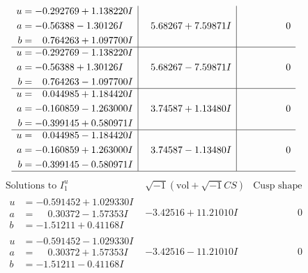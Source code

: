 \documentclass[1p]{elsarticle_modified}
\theoremstyle{definition}
\newcommand{\I}{\sqrt{-1}}
\begin{document}
$$\begin{array}{c|c|c}
\begin{aligned}
u &= -0.292769 + 1.138220 I \\
a &= -0.56388 - 1.30126 I \\
b &= \phantom{-}0.764263 + 1.097700 I\end{aligned}
 & \phantom{-}5.68267 + 7.59871 I & \phantom{-0.000000 } 0 \\ \hline\begin{aligned}
u &= -0.292769 - 1.138220 I \\
a &= -0.56388 + 1.30126 I \\
b &= \phantom{-}0.764263 - 1.097700 I\end{aligned}
 & \phantom{-}5.68267 - 7.59871 I & \phantom{-0.000000 } 0 \\ \hline\begin{aligned}
u &= \phantom{-}0.044985 + 1.184420 I \\
a &= -0.160859 - 1.263000 I \\
b &= -0.399145 + 0.580971 I\end{aligned}
 & \phantom{-}3.74587 + 1.13480 I & \phantom{-0.000000 } 0 \\ \hline\begin{aligned}
u &= \phantom{-}0.044985 - 1.184420 I \\
a &= -0.160859 + 1.263000 I \\
b &= -0.399145 - 0.580971 I\end{aligned}
 & \phantom{-}3.74587 - 1.13480 I & \phantom{-0.000000 } 0\\
 \hline 
 \end{array}$$\newpage$$\begin{array}{c|c|c}  
\text{Solutions to }I^u_{1}& \I (\text{vol} + \sqrt{-1}CS) & \text{Cusp shape}\\
 \hline 
\begin{aligned}
u &= -0.591452 + 1.029330 I \\
a &= \phantom{-}0.30372 - 1.57353 I \\
b &= -1.51211 + 0.41168 I\end{aligned}
 & -3.42516 + 11.21010 I & \phantom{-0.000000 } 0 \\ \hline\begin{aligned}
u &= -0.591452 - 1.029330 I \\
a &= \phantom{-}0.30372 + 1.57353 I \\
b &= -1.51211 - 0.41168 I\end{aligned}
 & -3.42516 - 11.21010 I & \phantom{-0.000000 } 0 \\ \hline\begin{aligned}

\end{aligned}
\end{array}$$
\end{document}
